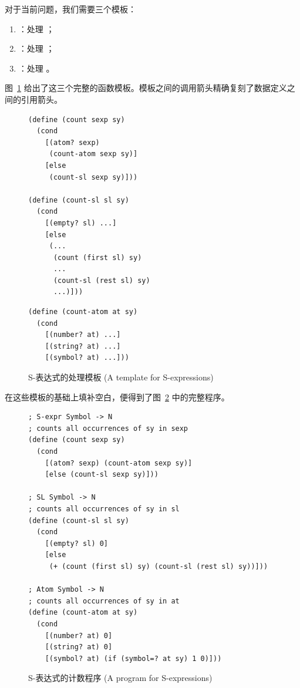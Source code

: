 对于当前问题，我们需要三个模板：
\begin{enumerate}
  \item {}：处理 ；
  \item {}：处理 ；
  \item {}：处理 。
\end{enumerate}

图~\ref{fig:116} 给出了这三个完整的函数模板。模板之间的调用箭头精确复刻了数据定义之间的引用箭头。

\begin{figure}[htbp]
  \centering
\begin{stepperbox}[unbreakable]
\noindent\begin{minipage}[t]{0.48\linewidth}\vspace{0pt}
\begin{Verbatim}[fontsize=\fontsize{6.0pt}{7.2pt}\selectfont]
(define (count sexp sy)
  (cond
    [(atom? sexp)
     (count-atom sexp sy)]
    [else
     (count-sl sexp sy)]))

(define (count-sl sl sy)
  (cond
    [(empty? sl) ...]
    [else
     (...
      (count (first sl) sy)
      ...
      (count-sl (rest sl) sy)
      ...)]))
\end{Verbatim}
\end{minipage}\hfill
\noindent\begin{minipage}[t]{0.48\linewidth}\vspace{0pt}
\begin{Verbatim}[fontsize=\fontsize{6.0pt}{7.2pt}\selectfont]
(define (count-atom at sy)
  (cond
    [(number? at) ...]
    [(string? at) ...]
    [(symbol? at) ...]))
\end{Verbatim}
\end{minipage}
\end{stepperbox}
  \caption{S-表达式的处理模板 (A template for S-expressions)}
  \label{fig:116}
\end{figure}

在这些模板的基础上填补空白，便得到了图~\ref{fig:117} 中的完整程序。

\begin{figure}[htbp]
  \centering
\begin{lstlisting}[language=BSL, basicstyle=\scriptsize\ttfamily]
; S-expr Symbol -> N
; counts all occurrences of sy in sexp
(define (count sexp sy)
  (cond
    [(atom? sexp) (count-atom sexp sy)]
    [else (count-sl sexp sy)]))

; SL Symbol -> N
; counts all occurrences of sy in sl
(define (count-sl sl sy)
  (cond
    [(empty? sl) 0]
    [else
     (+ (count (first sl) sy) (count-sl (rest sl) sy))]))

; Atom Symbol -> N
; counts all occurrences of sy in at
(define (count-atom at sy)
  (cond
    [(number? at) 0]
    [(string? at) 0]
    [(symbol? at) (if (symbol=? at sy) 1 0)]))
\end{lstlisting}
  \caption{S-表达式的计数程序 (A program for S-expressions)}
  \label{fig:117}
\end{figure}


